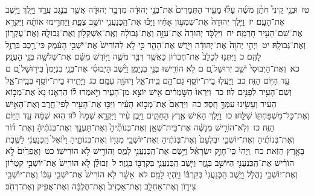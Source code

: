 \documentclass[18pt]{article}
\newcommand{\kri}[1]{\Afootnote{#1}}	%
\begin{document}
 {\loc טז~}וּבְנֵ֣י קֵינִי֩ חֹתֵ֨ן מֹשֶׁ֜ה עָל֨וּ מֵעִ֤יר הַתְּמָרִים֙ אֶת־בְּנֵ֣י יְהוּדָ֔ה מִדְבַּ֣ר יְהוּדָ֔ה אֲשֶׁ֖ר בְּנֶ֣גֶב עֲרָ֑ד וַיֵּ֖לֶךְ וַיֵּ֥שֶׁב אֶת־הָעָֽם׃ \startlock
 {\loc יז~}וַיֵּ֤לֶךְ יְהוּדָה֙ אֶת־שִׁמְע֣וֹן אָחִ֔יו וַיַּכּ֕וּ אֶת־הַֽכְּנַעֲנִ֖י יוֹשֵׁ֣ב צְפַ֑ת וַיַּחֲרִ֣ימוּ אוֹתָ֔הּ וַיִּקְרָ֥א אֶת־שֵׁם־הָעִ֖יר חׇרְמָֽה׃ \startlock
 {\loc יח~}וַיִּלְכֹּ֤ד יְהוּדָה֙ אֶת־עַזָּ֣ה וְאֶת־גְּבוּלָ֔הּ וְאֶֽת־אַשְׁקְל֖וֹן וְאֶת־גְּבוּלָ֑הּ וְאֶת־עֶקְר֖וֹן וְאֶת־גְּבוּלָֽהּ׃ \startlock
 {\loc יט~}וַיְהִ֤י יְהֹוָה֙ אֶת־יְהוּדָ֔ה וַיֹּ֖רֶשׁ אֶת־הָהָ֑ר כִּ֣י לֹ֤א לְהוֹרִישׁ֙ אֶת־יֹשְׁבֵ֣י הָעֵ֔מֶק כִּי־רֶ֥כֶב בַּרְזֶ֖ל לָהֶֽם׃ \startlock
 {\loc כ~}וַיִּתְּנ֤וּ לְכָלֵב֙ אֶת־חֶבְר֔וֹן כַּאֲשֶׁ֖ר דִּבֶּ֣ר מֹשֶׁ֑ה וַיּ֣וֹרֶשׁ מִשָּׁ֔ם אֶת־שְׁלֹשָׁ֖ה בְּנֵ֥י הָעֲנָֽק׃ \startlock
 {\loc כא~}וְאֶת־הַיְבוּסִי֙ יֹשֵׁ֣ב יְרוּשָׁל ַ֔͏ְם ם לֹ֥א הוֹרִ֖ישׁוּ בְּנֵ֣י בִנְיָמִ֑ן וַיֵּ֨שֶׁב הַיְבוּסִ֜י אֶת־בְּנֵ֤י בִנְיָמִן֙ בִּיר֣וּשָׁל ַ֔͏ְם ם עַ֖ד הַיּ֥וֹם הַזֶּֽה׃ \startlock
 {\loc כב~}וַיַּעֲל֧וּ בֵית־יוֹסֵ֛ף גַּם־הֵ֖ם בֵּֽית־אֵ֑ל וַיהֹוָ֖ה עִמָּֽם׃ \startlock
 {\loc כג~}וַיָּתִ֥ירוּ בֵית־יוֹסֵ֖ף בְּבֵֽית־אֵ֑ל וְשֵׁם־הָעִ֥יר לְפָנִ֖ים לֽוּז׃ \startlock
 {\loc כד~}וַיִּרְאוּ֙ הַשֹּׁ֣מְרִ֔ים אִ֖ישׁ יוֹצֵ֣א מִן־הָעִ֑יר וַיֹּ֣אמְרוּ ל֗וֹ הַרְאֵ֤נוּ נָא֙ אֶת־מְב֣וֹא הָעִ֔יר וְעָשִׂ֥ינוּ עִמְּךָ֖ חָֽסֶד׃ \startlock
 {\loc כה~}וַיַּרְאֵם֙ אֶת־מְב֣וֹא הָעִ֔יר וַיַּכּ֥וּ אֶת־הָעִ֖יר לְפִי־חָ֑רֶב וְאֶת־הָאִ֥ישׁ וְאֶת־כׇּל־מִשְׁפַּחְתּ֖וֹ שִׁלֵּֽחוּ׃ \startlock
 {\loc כו~}וַיֵּ֣לֶךְ הָאִ֔ישׁ אֶ֖רֶץ הַחִתִּ֑ים וַיִּ֣בֶן עִ֗יר וַיִּקְרָ֤א שְׁמָהּ֙ ל֔וּז ה֣וּא שְׁמָ֔הּ עַ֖ד הַיּ֥וֹם הַזֶּֽה׃ \startlock
 {\loc כז~}וְלֹֽא־הוֹרִ֣ישׁ מְנַשֶּׁ֗ה אֶת־בֵּית־שְׁאָ֣ן וְאֶת־בְּנוֹתֶ֘יהָ֮ וְאֶת־תַּעְנַ֣ךְ וְאֶת־בְּנֹתֶ֒יהָ֒ וְאֶת־ \edtext{(יושב)}{\kri{קרי: יוֹשְׁבֵ֨י}}  ד֜וֹר וְאֶת־בְּנוֹתֶ֗יהָ וְאֶת־יוֹשְׁבֵ֤י יִבְלְעָם֙ וְאֶת־בְּנֹתֶ֔יהָ וְאֶת־יוֹשְׁבֵ֥י מְגִדּ֖וֹ וְאֶת־בְּנוֹתֶ֑יהָ וַיּ֙וֹאֶל֙ הַֽכְּנַעֲנִ֔י לָשֶׁ֖בֶת בָּאָ֥רֶץ הַזֹּֽאת׃ \startlock
 {\loc כח~}וַֽיְהִי֙ כִּֽי־חָזַ֣ק יִשְׂרָאֵ֔ל וַיָּ֥שֶׂם אֶת־הַֽכְּנַעֲנִ֖י לָמַ֑ס וְהוֹרֵ֖ישׁ לֹ֥א הוֹרִישֽׁוֹ׃ \startlock
 {\loc כט~}וְאֶפְרַ֙יִם֙ לֹ֣א הוֹרִ֔ישׁ אֶת־הַֽכְּנַעֲנִ֖י הַיּוֹשֵׁ֣ב בְּגָ֑זֶר וַיֵּ֧שֶׁב הַֽכְּנַעֲנִ֛י בְּקִרְבּ֖וֹ בְּגָֽזֶר׃ \startlock
 {\loc ל~}זְבוּלֻ֗ן לֹ֤א הוֹרִישׁ֙ אֶת־יוֹשְׁבֵ֣י קִטְר֔וֹן וְאֶת־יוֹשְׁבֵ֖י נַהֲלֹ֑ל וַיֵּ֤שֶׁב הַֽכְּנַעֲנִי֙ בְּקִרְבּ֔וֹ וַיִּֽהְי֖וּ לָמַֽס׃ \startlock
 {\loc לא~}אָשֵׁ֗ר לֹ֤א הוֹרִישׁ֙ אֶת־יֹשְׁבֵ֣י עַכּ֔וֹ וְאֶת־יוֹשְׁבֵ֖י צִיד֑וֹן וְאֶת־אַחְלָ֤ב וְאֶת־אַכְזִיב֙ וְאֶת־חֶלְבָּ֔ה וְאֶת־אֲפִ֖יק וְאֶת־רְחֹֽב׃ \startlock
\end{document}
